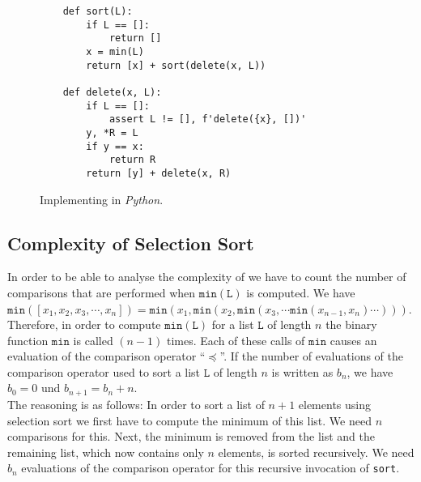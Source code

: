 \begin{figure}[!ht]
  \centering
\begin{verbatim}
    def sort(L):
        if L == []:
            return []
        x = min(L)
        return [x] + sort(delete(x, L))
    
    def delete(x, L):
        if L == []:
            assert L != [], f'delete({x}, [])'
        y, *R = L
        if y == x:
            return R
        return [y] + delete(x, R)    
\end{verbatim}
\vspace*{-0.3cm}
  \caption{Implementing  in \textsl{Python}.}
  \label{fig:selection-sort.setlx}
\end{figure}


\subsection{Complexity of Selection Sort}
In order to be able to analyse the complexity of  we have to count the number
of comparisons that are performed when $\mathtt{min}(\texttt{L})$ is computed.  We have 
\\[0.2cm]
\hspace*{1.3cm} 
$\mathtt{min}([x_1,x_2,x_3,\cdots,x_n]) = \mathtt{min}(x_1, \mathtt{min}(x_2, \mathtt{min}(x_3, \cdots \mathtt{min}(x_{n-1},x_n) \cdots )))$. 
\\[0.2cm]
Therefore, in order to compute $\mathtt{min}(\texttt{L})$ for a list $\texttt{L}$ of length $n$ the binary function $\mathtt{min}$
is called $(n-1)$ times.  Each of these calls of $\mathtt{min}$ causes an evaluation of the comparison
operator ``$\preceq$''.  If the number of evaluations of the comparison operator used to sort a list
$\texttt{L}$ of length $n$ is written as $b_n$, we have \\[0.2cm]
\hspace*{1.3cm}
$b_0 = 0$ \quad und \quad $b_{n+1} = b_n + n$. 
\\[0.2cm]
The reasoning is as follows: In order to sort a list of $n+1$ elements using selection sort we first
have to compute the minimum of this list.  We need $n$ comparisons for this.  Next, the minimum is
removed from the list and the remaining list, which now contains only $n$ elements, is sorted
recursively.  We need $b_n$ evaluations of the comparison operator for this recursive invocation of
\texttt{sort}.

